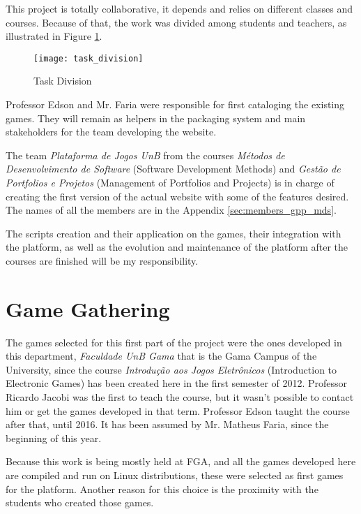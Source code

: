 This project is totally collaborative, it depends and relies on different classes and courses. Because of that, the work was divided among students and teachers, as illustrated in Figure \ref{fig:task_division}.

\begin{figure}[h!]
\centering
\texttt{[image: task\_division]}
\caption{Task Division}
\label{fig:task_division}
\end{figure}

Professor Edson and Mr. Faria were responsible for first cataloging the existing games. They will remain as helpers in the packaging system and main stakeholders for the team developing the website.

The team \textit{Plataforma de Jogos UnB} from the courses \textit{M\'etodos de Desenvolvimento de Software} (Software Development Methods) and \textit{Gest\~ao de Portfolios e Projetos} (Management of Portfolios and Projects) is in charge of creating the first version of the actual website with some of the features desired. The names of all the members are in the Appendix \ref{sec:members_gpp_mds}.

The scripts creation and their application on the games, their integration with the platform, as well as the evolution and maintenance of the platform after the courses are finished will be my responsibility.


\section{Game Gathering}
\label{sec:game_gathering}

The games selected for this first part of the project were the ones developed in this department, \textit{Faculdade UnB Gama} that is the Gama Campus of the University, since the course \textit{Introdu\c{c}\~ao aos Jogos Eletr\^onicos} (Introduction to Electronic Games) has been created here in the first semester of 2012. Professor Ricardo Jacobi was the first to teach the course, but it wasn't possible to contact him or get the games developed in that term. Professor Edson taught the course after that, until 2016. It has been assumed by Mr. Matheus Faria, since the beginning of this year.

Because this work is being mostly held at FGA, and all the games developed here are compiled and run on Linux distributions, these were selected as first games for the platform. Another reason for this choice is the proximity with the students who created those games.

